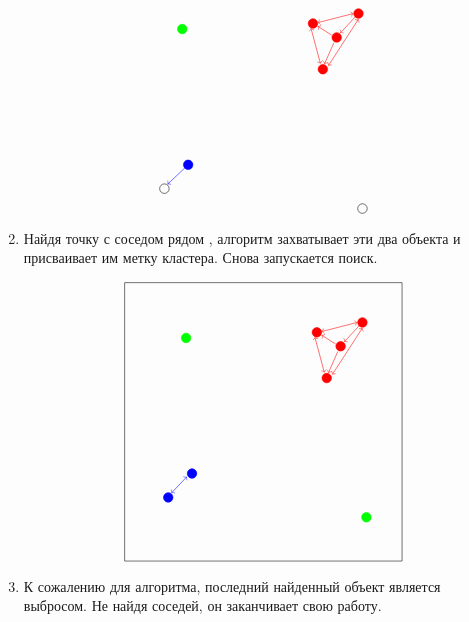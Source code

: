 \begin{enumerate}
\[\begin{tikzpicture}
        \draw[red, fill=red] (2.5, 2.5) circle (0.12);
        \draw[red, fill=red] (1.35, 2.25) circle (0.12);
        \draw[red, fill=red] (1.6, 1.1) circle (0.12);
        \draw[red, fill=red] (1.95, 1.9) circle (0.12);
        \draw (-2.4, -1.9) circle (0.12);
        \draw[blue, fill=blue] (-1.8, -1.3) circle (0.12);
        \draw[green, fill=green] (-1.95, 2.11) circle (0.12);
        \draw (2.6, -2.4) circle (0.12);
        
        \draw[->][red] (2.435, 2.435) -- (2.04, 2.01);
        \draw[->][red] (1.88, 1.77) -- (1.64, 1.23);
        \draw[->][red] (1.82, 1.96) -- (1.47, 2.18);
        \draw[<->][red] (1.54, 1.24) -- (1.30, 2.13);
        \draw[<->][red] (1.74, 1.19) -- (2.5, 2.36);
        \draw[<->][red] (1.47, 2.27) -- (2.37, 2.5);
        
        \draw[->][blue] (-1.8, -1.3) -- (-2.32, -1.79);
\end{tikzpicture}
\]
\item Найдя точку с соседом рядом , алгоритм захватывает эти два объекта и присваивает им метку кластера. Снова запускается поиск.

\[
\begin{tikzpicture}
        \draw (-3.5, 3.5) -- (3.5, 3.5);
        \draw (-3.5, -3.5) -- (3.5, -3.5);
        \draw (-3.5, -3.5) -- (-3.5, 3.5);
        \draw (3.5, 3.5) -- (3.5, -3.5);
        
        \draw[red, fill=red] (2.5, 2.5) circle (0.12);
        \draw[red, fill=red] (1.35, 2.25) circle (0.12);
        \draw[red, fill=red] (1.6, 1.1) circle (0.12);
        \draw[red, fill=red] (1.95, 1.9) circle (0.12);
        \draw[blue, fill=blue] (-2.4, -1.9) circle (0.12);
        \draw[blue, fill=blue] (-1.8, -1.3) circle (0.12);
        \draw[green, fill=green] (-1.95, 2.11) circle (0.12);
        \draw[green, fill=green] (2.6, -2.4) circle (0.12);
        
        \draw[->][red] (2.435, 2.435) -- (2.04, 2.01);
        \draw[->][red] (1.88, 1.77) -- (1.64, 1.23);
        \draw[->][red] (1.82, 1.96) -- (1.47, 2.18);
        \draw[<->][red] (1.54, 1.24) -- (1.30, 2.13);
        \draw[<->][red] (1.74, 1.19) -- (2.5, 2.36);
        \draw[<->][red] (1.47, 2.27) -- (2.37, 2.5);
        
        \draw[<->][blue] (-1.93, -1.38) -- (-2.32, -1.79);
\end{tikzpicture}
\]
\item К сожалению для алгоритма, последний найденный объект является выбросом. Не найдя соседей, он заканчивает свою работу.
\end{enumerate}
%

